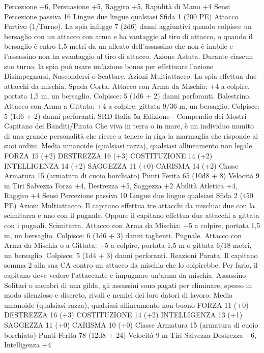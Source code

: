 \begin{multicols}{2}
Percezione +6, Persuasione +5, Raggiro +5, Rapidità di Mano +4
Sensi Percezione passiva 16
Lingue due lingue qualsiasi
Sfida 1 (200 PE)
Attacco Furtivo (1/Turno). La spia infligge 7 (2d6) danni aggiuntivi
quando colpisce un bersaglio con un attacco con arma e ha vantaggio
al tiro di attacco, o quando il bersaglio è entro 1,5 metri da un alleato
dell’assassino che non è inabile e l’assassino non ha svantaggio al
tiro di attacco.
Azione Astuta. Durante ciascun suo turno, la spia può usare un’azione
bonus per effettuare l’azione Disimpegnarsi, Nascondersi o Scattare.
Azioni
Multiattacco. La spia effettua due attacchi da mischia.
Spada Corta. Attacco con Arma da Mischia: +4 a colpire, portata
1,5 m, un bersaglio.
Colpisce: 5 (1d6 + 2) danni perforanti.
Balestrino. Attacco con Arma a Gittata: +4 a colpire, gittata 9/36
m, un bersaglio. Colpisce: 5 (1d6 + 2) danni perforanti.
SRD Italia 5a Edizione - Compendio dei Mostri
Capitano dei Banditi/Pirata
Che viva in terra o in mare, è un individuo munito di una
grande personalità che riesce a tenere in riga la
marmaglia che risponde ai suoi ordini.
Media umanoide (qualsiasi razza), qualsiasi allineamento non
legale
FORZA 15 (+2)
DESTREZZA 16 (+3)
COSTITUZIONE 14 (+2)
INTELLIGENZA 14 (+2)
SAGGEZZA 11 (+0)
CARISMA 14 (+2)
Classe Armatura 15 (armatura di cuoio borchiato)
Punti Ferita 65 (10d8 + 8)
Velocità 9 m
Tiri Salvezza Forza +4, Destrezza +5, Saggezza +2
Abilità Atletica +4, Raggiro +4
Sensi Percezione passiva 10
Lingue due lingue qualsiasi
Sfida 2 (450 PE)
Azioni
Multiattacco. Il capitano effettua tre attacchi da mischia: due con
la scimitarra e uno con il pugnale. Oppure il capitano effettua
due attacchi a gittata con i pugnali.
Scimitarra. Attacco con Arma da Mischia: +5 a colpire, portata
1,5 m, un bersaglio.
Colpisce: 6 (1d6 + 3) danni taglienti.
Pugnale. Attacco con Arma da Mischia o a Gittata: +5 a colpire,
portata 1,5 m o gittata 6/18 metri, un bersaglio.
Colpisce: 5 (1d4 + 3) danni perforanti.
Reazioni
Parata. Il capitano somma 2 alla sua CA contro un attacco da
mischia che lo colpirebbe. Per farlo, il capitano deve vedere
l’attaccante e impugnare un’arma da mischia.
Assassino
Solitari o membri di una gilda, gli assassini sono pagati
per eliminare, spesso in modo silenzioso e discreto,
rivali e nemici dei loro datori di lavoro.
Media umanoide (qualsiasi razza), qualsiasi allineamento non
buono
FORZA 11 (+0)
DESTREZZA 16 (+3)
COSTITUZIONE 14 (+2)
INTELLIGENZA 13 (+1)
SAGGEZZA 11 (+0)
CARISMA 10 (+0)
Classe Armatura 15 (armatura di cuoio borchiato)
Punti Ferita 78 (12d8 + 24)
Velocità 9 m
Tiri Salvezza Destrezza +6, Intelligenza +4

\end{multicols}
